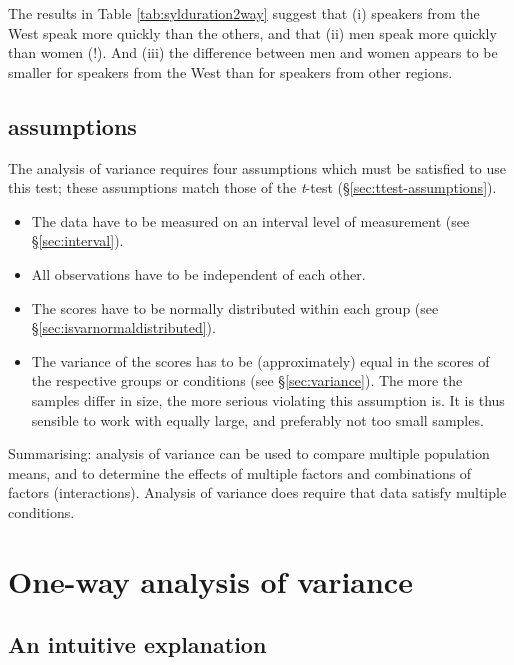 \documentclass[
]{book}
\begin{document}
The results in Table \ref{tab:sylduration2way} suggest that (i) speakers from the
West speak more quickly than the others, and that (ii) men speak more quickly than
women (!). And (iii) the difference between men and women appears to be smaller
for speakers from the West than for speakers from other regions.

\hypertarget{assumptions-2}{%
\subsection{assumptions}\label{assumptions-2}}

The analysis of variance requires four assumptions which
must be satisfied to use this test; these assumptions match those of the
\emph{t}-test
(§\ref{sec:ttest-assumptions}).

\begin{itemize}
\item
  The data have to be measured on an interval level of measurement (see
  §\ref{sec:interval}).
\item
  All observations have to be independent of each other.
\item
  The scores have to be normally distributed within each group (see
  §\ref{sec:isvarnormaldistributed}).
\item
  The variance of the scores has to be (approximately) equal in
  the scores of the respective groups or conditions (see
  §\ref{sec:variance}).
  The more the samples differ in size, the more serious
  violating this assumption is. It is thus sensible to work with
  equally large, and preferably not too small samples.
\end{itemize}

Summarising: analysis of variance can be used to compare multiple
population means, and to determine the effects of multiple
factors and combinations of factors (interactions).
Analysis of variance does require that data satisfy multiple
conditions.

\hypertarget{one-way-analysis-of-variance}{%
\section{One-way analysis of variance}\label{one-way-analysis-of-variance}}

\hypertarget{sec:anova-oneway-explanation}{%
\subsection{An intuitive explanation}\label{sec:anova-oneway-explanation}}
\end{document}

